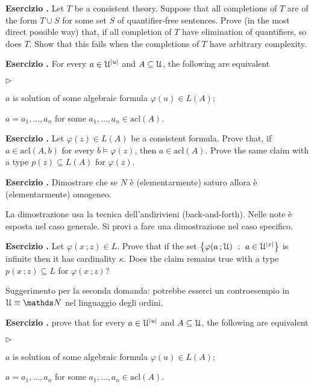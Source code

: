 \documentclass[10pt]{article}
\def\phi{\varphi}
\def\U{\EuScript U}
\def\sm{\smallsetminus}
\def\NN{\mathds N}
\def\acl{\textrm{acl}}
\newcommand{\labella}[1]{{\sf\footnotesize #1}\hfill}
\renewenvironment{itemize}
  {\begin{list}{$\triangleright$}{%
   \setlength{\parskip}{0mm}
   \setlength{\topsep}{0mm}
   \setlength{\rightmargin}{0mm}
   \setlength{\listparindent}{0mm}
   \setlength{\itemindent}{0mm}
   \setlength{\labelwidth}{3ex}
   \setlength{\itemsep}{0mm}
   \setlength{\parsep}{0mm}
   \setlength{\partopsep}{0mm}
   \setlength{\labelsep}{1ex}
   \setlength{\leftmargin}{\labelwidth+\labelsep}
   \let\makelabel\labella}}{%
   \end{list}}
\newcounter{ex}
\newenvironment{exercise}{\clearpage\addtocounter{ex}{1}\textbf{Esercizio \theex.\quad}}{}
\begin{document}
\clearpage%
\setcounter{ex}{0}

\begin{exercise}
Let $T$ be a consistent theory. Suppose that all completions of $T$ are of the form 
$T\cup S$ for some set $S$ of quantifier-free sentences. Prove (in the  most direct possible way) that, if all completion of $T$ have elimination of quantifiers, so does $T$. Show that this fails when the completions of $T$ have arbitrary complexity. 
\end{exercise}


\begin{exercise}
For every $a\in\U^{|u|}$ and $A\subseteq\U$, the following are equivalent
\begin{itemize}
\item[1.] $a$ is solution of some algebraic formula  $\phi(u)\in L(A)$;
\item[2.] $a= a_1,\dots, a_n$ for some $ a_1,\dots, a_n\in\acl(A)$. 
\end{itemize}
\end{exercise}

\begin{exercise}\label{pofu}
Let $\phi( z)\in L(A)$ be a consistent formula. Prove that, if $a\in\acl(A, b)$ for every $b\models\phi(z)$, then $a\in\acl(A)$. Prove the same claim with a type $p(z)\subseteq L(A)$ for $\phi(z)$.
\end{exercise}


\clearpage%
\rhead{\hfill  Tutti $\sm\{\}$}\setcounter{ex}{0}

\begin{exercise}
Dimostrare che se $N$ è (elementarmente) saturo allora è (elementarmente) omogeneo.

La dimostrazione usa la tecnica dell'andirivieni (back-and-forth). Nelle note è esposta nel caso generale. Si provi a fare una dimostrazione nel caso specifico.
\end{exercise}


\begin{exercise}
Let $\phi(x\,;z)\in L$. Prove that if the set $\big\{\phi(a\,;\U)\ :\ a\in\U^{|x|}\big\}$ is infinite then it has cardinality $\kappa$. Does the claim remains true with a type $p(x\,;z)\subseteq L$ for $\phi(x\,;z)$?

Suggerimento per la seconda domanda: potrebbe esserci un controesempio in $\U\equiv\NN$ nel linguaggio degli ordini.
\end{exercise}


\begin{exercise}
prove that for every $a\in\U^{|u|}$ and $A\subseteq\U$, the following are equivalent
\begin{itemize}
\item[1.] $a$ is solution of some algebraic formula  $\phi(u)\in L(A)$;
\item[2.] $a= a_1,\dots, a_n$ for some $ a_1,\dots, a_n\in\acl(A)$. 
\end{itemize}
\end{exercise}
\end{document}
